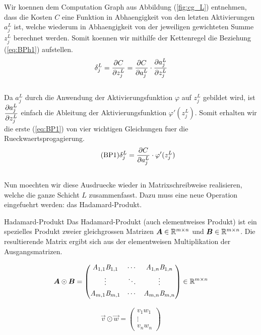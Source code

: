 Wir koennen dem Computation Graph aus Abbildung (\ref{fig:cg_L}) entnehmen, dass die Kosten $C$ eine Funktion
in Abhaengigkeit von den letzten Aktivierungen $a_j^L$ ist, welche wiederum in
Abhaengigkeit von der jeweiligen gewichteten Summe $z_j^L$ berechnet werden.
Somit koennen wir mithilfe der Kettenregel die Beziehung (\ref{eq:BPh1}) aufstellen.
\\
\begin{equation}\label{eq:BPh1}
  \delta_j^L = \frac{\partial C}{\partial z_j^L} = \frac{\partial C}{\partial a_j^L} \cdot \frac{\partial a_j^L}{\partial z_j^L}
\end{equation}
\\
Da $a_j^L$ durch die Anwendung der Aktivierungsfunktion $\varphi$ auf $z_j^L$
gebildet wird, ist $\displaystyle\frac{\partial a_j^L}{\partial z_j^L}$ einfach die Ableitung der Aktivierungsfunktion
$\varphi'(z_j^L)$. Somit erhalten wir die erste (\ref{eq:BP1}) von vier
wichtigen Gleichungen fuer die Rueckwaertsprogagierung.
\\
\begin{equation}\tag{BP1}\label{eq:BP1}
  \delta_j^L = \frac{\partial C}{\partial a_j^L} \cdot \varphi'(z_j^L)
\end{equation}
\\
Nun moechten wir diese Ausdruecke wieder in Matrixschreibweise realisieren,
welche die ganze Schicht $L$ zusammenfasst. Dazu
muss eine neue Operation eingefuehrt werden: das Hadamard-Produkt.

\begin{defbox}{Hadamard-Produkt}
  Das Hadamard-Produkt (auch elementweises Produkt) ist ein spezielles Produkt zweier gleichgrossen Matrizen
  $\bm{A} \in \mathbb{R}^{m \times n}$ und $\bm{B} \in \mathbb{R}^{m \times n}$.
  Die resultierende Matrix ergibt sich aus der elementweisen Multiplikation der Ausgangsmatrizen.

  \begin{minipage}{0.5\textwidth}
    \begin{equation*}
      \bm{A} \odot \bm{B} =
      \begin{pmatrix}
        \mathit{A}_{1,1} \mathit{B}_{1,1} & \cdots & \mathit{A}_{1,n} \mathit{B}_{1,n} \\[0.3em]
        \vdots & \ddots & \vdots \\[0.3em]
        \mathit{A}_{m,1} \mathit{B}_{m,1} & \cdots & \mathit{A}_{m,n} \mathit{B}_{m,n} \\[0.3em]
      \end{pmatrix}
      \in \mathbb{R}^{m \times n}
    \end{equation*}
  \end{minipage}
  \begin{minipage}{0.5\textwidth}
    \begin{equation*}
      \vec{v} \odot \vec{w} =
      \begin{pmatrix}
        v_1 w_1 \\
        \vdots \\
        v_n w_n
      \end{pmatrix}
    \end{equation*}

  \end{minipage}
\end{defbox}
\para{}

